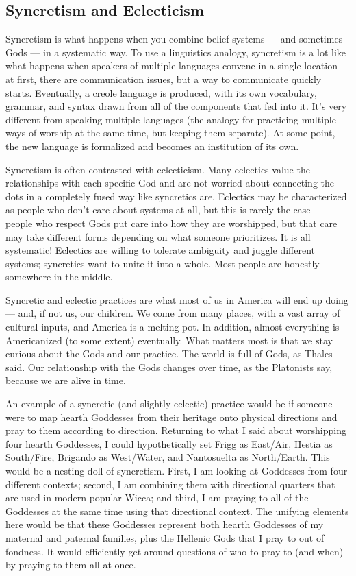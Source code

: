 \documentclass[
]{book}
\begin{document}
\hypertarget{syncretism-and-eclecticism}{%
\subsection{Syncretism and Eclecticism}\label{syncretism-and-eclecticism}}

Syncretism is what happens when you combine belief systems --- and sometimes Gods --- in a systematic way. To use a linguistics analogy, syncretism is a lot like what happens when speakers of multiple languages convene in a single location --- at first, there are communication issues, but a way to communicate quickly starts. Eventually, a creole language is produced, with its own vocabulary, grammar, and syntax drawn from all of the components that fed into it. It's very different from speaking multiple languages (the analogy for practicing multiple ways of worship at the same time, but keeping them separate). At some point, the new language is formalized and becomes an institution of its own.

Syncretism is often contrasted with eclecticism. Many eclectics value the relationships with each specific God and are not worried about connecting the dots in a completely fused way like syncretics are. Eclectics may be characterized as people who don't care about systems at all, but this is rarely the case --- people who respect Gods put care into how they are worshipped, but that care may take different forms depending on what someone prioritizes. It is all systematic! Eclectics are willing to tolerate ambiguity and juggle different systems; syncretics want to unite it into a whole. Most people are honestly somewhere in the middle.

Syncretic and eclectic practices are what most of us in America will end up doing --- and, if not us, our children. We come from many places, with a vast array of cultural inputs, and America is a melting pot. In addition, almost everything is Americanized (to some extent) eventually. What matters most is that we stay curious about the Gods and our practice. The world is full of Gods, as Thales said. Our relationship with the Gods changes over time, as the Platonists say, because we are alive in time.

An example of a syncretic (and slightly eclectic) practice would be if someone were to map hearth Goddesses from their heritage onto physical directions and pray to them according to direction. Returning to what I said about worshipping four hearth Goddesses, I could hypothetically set Frigg as East/Air, Hestia as South/Fire, Brigando as West/Water, and Nantosuelta as North/Earth. This would be a nesting doll of syncretism. First, I am looking at Goddesses from four different contexts; second, I am combining them with directional quarters that are used in modern popular Wicca; and third, I am praying to all of the Goddesses at the same time using that directional context. The unifying elements here would be that these Goddesses represent both hearth Goddesses of my maternal and paternal families, plus the Hellenic Gods that I pray to out of fondness. It would efficiently get around questions of who to pray to (and when) by praying to them all at once.
\end{document}
